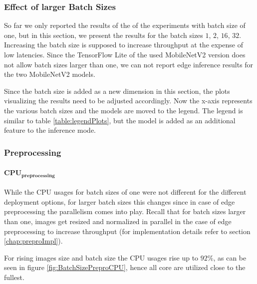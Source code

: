 \subsubsection{Effect of larger Batch Sizes}
\label{chap:resultsBatchSize}
So far we only reported the results of the of the experiments with batch size of one, but in this section, we present the results for the batch sizes $1$, $2$, $16$, $32$.
Increasing the batch size is supposed to increase throughput at the expense of low latencies.
Since the TensorFlow Lite of the used MobileNetV2 version does not allow batch sizes larger than one, we can not report edge inference results for the two MobileNetV2 models.

Since the batch size is added as a new dimension in this section, the plots visualizing the results need to be adjusted accordingly.
Now the x-axis represents the various batch sizes and the models are moved to the legend. 
The legend is similar to table \ref{table:legendPlots}, but the model is added as an additional feature to the inference mode.
\subsubsection{Preprocessing}

\paragraph{$\mathbf{CPU_{preprocessing}}$}
While the CPU usages for batch sizes of one were not different for the different deployment options, for larger batch sizes this changes since in case of edge preprocessing the parallelism comes into play.
Recall that for batch sizes larger than one, images get resized and normalized in parallel in the case of edge preprocessing to increase throughput (for implementation details refer to section \ref{chap:preproImpl}).

For rising images size and batch size the CPU usages rise up to $92\%$, as can be seen in figure \ref{fig:BatchSizePreproCPU}, hence all core are utilized close to the fullest.



